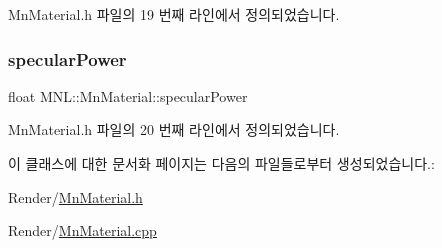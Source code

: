 Mn\+Material.\+h 파일의 19 번째 라인에서 정의되었습니다.

\mbox{\label{class_m_n_l_1_1_mn_material_abfcc4a9b518663738879256b440e432a}} 
\subsubsection{\texorpdfstring{specular\+Power}{specularPower}}
{\footnotesize\ttfamily float M\+N\+L\+::\+Mn\+Material\+::specular\+Power}



Mn\+Material.\+h 파일의 20 번째 라인에서 정의되었습니다.



이 클래스에 대한 문서화 페이지는 다음의 파일들로부터 생성되었습니다.\+:\begin{DoxyCompactItemize}
\item 
Render/\hyperlink{_mn_material_8h}{Mn\+Material.\+h}\item 
Render/\hyperlink{_mn_material_8cpp}{Mn\+Material.\+cpp}\end{DoxyCompactItemize}
